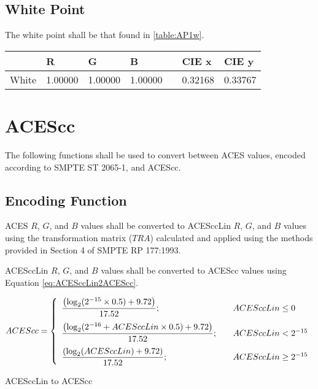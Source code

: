 \subsection{White Point}
The white point shall be that found in \autoref{table:AP1w}.

\begin{center}
\begin{tabularx}{4.5in}{XlllXll}
        & R       & G       & B       & & CIE x & CIE y \\ \hline
White   & 1.00000 & 1.00000 & 1.00000 & & 0.32168 & 0.33767 \\
\end{tabularx}
\label{table:AP1w}
\end{center}

\newpage
\section{ACEScc}
\label{sec:ACEScc}
The following functions shall be used to convert between ACES values, encoded according to SMPTE ST 2065-1, and ACEScc.

\subsection{Encoding Function}
ACES $R$, $G$, and $B$ values shall be converted to ACESccLin $R$, $G$, and $B$ values using the transformation matrix ($TRA$) calculated and applied using the methods provided in Section 4 of SMPTE RP 177:1993.

ACESccLin $R$, $G$, and $B$ values shall be converted to ACEScc values using Equation \ref{eq:ACESccLin2ACEScc}.

\begin{floatequ} 
\begin{equation} 
    ACEScc = \left\{ 
    \begin{array}{l l }
        \dfrac{\left(\log_{2}(2^{-15} \times 0.5) + 9.72\right)}{17.52};    & \quad ACESccLin \leq 0 \\[10pt]
        \dfrac{\left(\log_{2}(2^{-16} + ACESccLin \times 0.5) + 9.72\right)}{17.52};        & \quad ACESccLin < 2^{-15} \\[10pt]
        \dfrac{\left(\log_{2}(ACESccLin) + 9.72\right)}{17.52}; & \quad ACESccLin \geq 2^{-15} \\    
    \end{array} \right.
\end{equation}
\caption{ACESccLin to ACEScc}
\label{eq:ACESccLin2ACEScc}
\end{floatequ}

